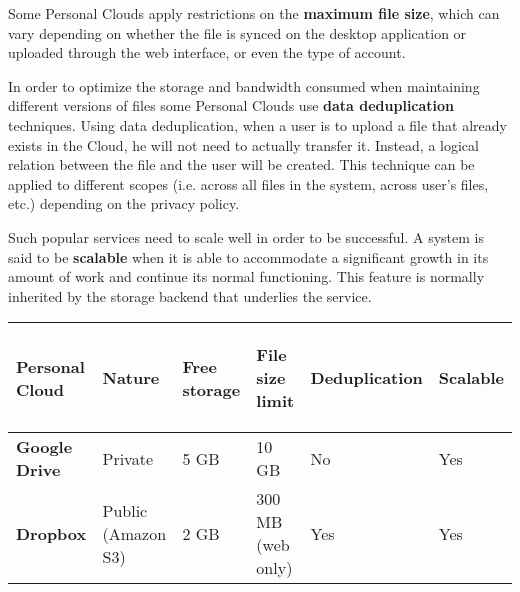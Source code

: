 {Some Personal Clouds apply restrictions on the \textbf{maximum file size}, which can vary depending on whether the file is synced on the desktop application or uploaded through the web interface, or even the type of account.

In order to optimize the storage and bandwidth consumed when maintaining different versions of files some Personal Clouds use \textbf{data deduplication} techniques. Using data deduplication, when a user is to upload a file that already exists in the Cloud, he will not need to actually transfer it. Instead, a logical relation between the file and the user will be created. This technique can be applied to different scopes (i.e. across all files in the system, across user's files, etc.) depending on the privacy policy.

Such popular services need to scale well in order to be successful. A system is said to be \textbf{scalable} when it is able to accommodate a significant growth in its amount of work and continue its normal functioning. This feature is normally inherited by the storage backend that underlies the service.



\begin{table}
\begin{center}
    \begin{tabular}{ | p{3.4cm} | p{2.0cm} | p{2.6cm} | p{2.6cm} | p{1.0cm} | p{1.0cm} | }
    \hline
    \rowcolor[gray]{0.8}

	\textbf{Personal Cloud} &
	\begin{sideways}\textbf{Nature}\end{sideways} &
	\begin{sideways}\textbf{Free storage}\end{sideways} &
	\begin{sideways}\textbf{File size limit}\end{sideways} & 
	\begin{sideways}\textbf{Deduplication}\end{sideways} & 
	\begin{sideways}\textbf{Scalable}\end{sideways} \\ \hline

	\textbf{Google Drive} &
	Private &
	5 GB &
	10 GB &
	No &
	Yes \\ \hline

	\textbf{Dropbox} &
	Public (Amazon S3) &
	2 GB &
	300 MB (web only) &
	Yes &
	Yes \\ \hline
	

\end{tabular}
\end{center}
\end{table}}
